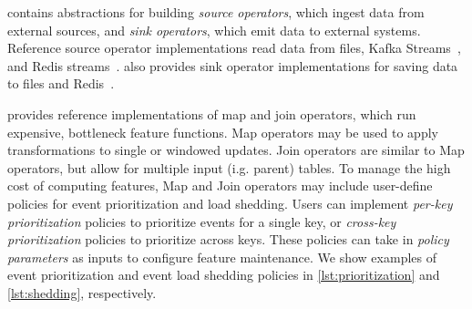
%
\system{} contains abstractions for building \textit{source operators}, which ingest data
from external sources, and
\textit{sink operators}, which emit data to external systems.
%
Reference source operator implementations read data from files, Kafka Streams~\cite{kafka},
and Redis streams~\cite{redis-streams}.
%
\system{} also provides sink operator implementations for saving data to files and Redis~\cite{redis}.


%
%
\system{} provides reference implementations of map and join operators,
which run expensive, bottleneck feature functions.
%
Map operators may be used to apply transformations to single or windowed updates. Join operators are similar to Map operators, but allow for multiple input (i.g. parent) tables. 
%
%
%
To manage the high cost of computing features, Map and Join operators may include user-define policies for event prioritization and load shedding. Users can implement \textit{per-key prioritization} policies to prioritize events for a single key, or \textit{cross-key prioritization} policies to prioritize across keys. These policies can take in \textit{policy parameters} as inputs to configure feature maintenance. We show examples of event prioritization and event load shedding policies in \cref{lst:prioritization} and \cref{lst:shedding}, respectively. 


